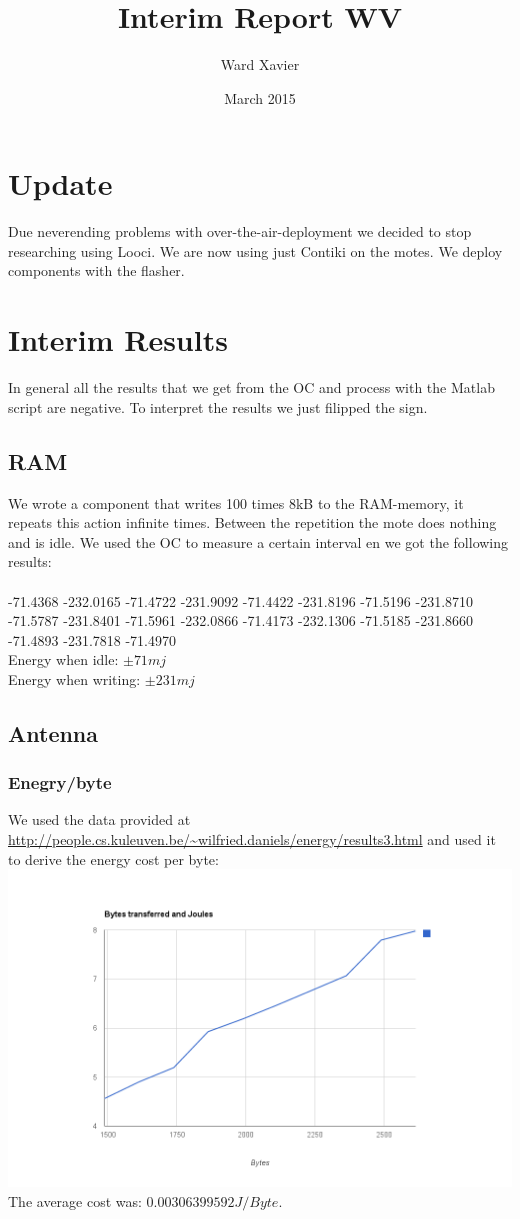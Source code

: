 \documentclass{article}
\title{Interim Report WV}
\author{Ward  Xavier}
\date{March 2015}
\begin{document}
\maketitle

\section{Update}
Due neverending problems with over-the-air-deployment we decided to stop researching using Looci. We are now using just Contiki on the motes. We deploy components with the flasher.
\section{Interim Results}
In general all the results that we get from the OC and process with the Matlab script are negative. To interpret the results we just filipped the sign.
\subsection{RAM}
We wrote a component that writes 100 times 8kB to the RAM-memory, it repeats this action infinite times. Between the repetition the mote does nothing and is idle. We used the OC to measure a certain interval en we got the following results:\\
\\
-71.4368 -232.0165  -71.4722 -231.9092  -71.4422 -231.8196  -71.5196 -231.8710  -71.5787 -231.8401  -71.5961 -232.0866  -71.4173 -232.1306  -71.5185 -231.8660  -71.4893 -231.7818  -71.4970
\\
Energy when idle: $\pm 71 mj$\\
Energy when writing: $\pm 231 mj$
\subsection{Antenna}
\subsubsection{Enegry/byte}
We used the data provided at \url{http://people.cs.kuleuven.be/~wilfried.daniels/energy/results3.html} and used it to derive the energy cost per byte:
\includegraphics[width=\linewidth]{graph.png}
The average cost was: $0.00306399592 J/Byte.$
\end{document}
